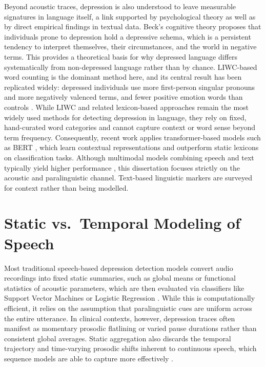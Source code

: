 \documentclass{mproj}
\begin{document}
Beyond acoustic traces, depression is also understood to leave measurable signatures in language itself, a link supported by psychological theory as well as by direct empirical findings in textual data. Beck's \cite{beck1967} cognitive theory proposes that individuals prone to depression hold a depressive schema, which is a persistent tendency to interpret themselves, their circumstances, and the world in negative terms. This provides a theoretical basis for why depressed language differs systematically from non-depressed language rather than by chance. LIWC-based word counting \cite{tausczik2010} is the dominant method here, and its central result has been replicated widely: depressed individuals use more first-person singular pronouns and more negatively valenced terms, and fewer positive emotion words than controls \cite{rude2004}. While LIWC and related lexicon-based approaches remain the most widely used methods for detecting depression in language, they rely on fixed, hand-curated word categories and cannot capture context or word sense beyond term frequency. Consequently, recent work applies transformer-based models such as BERT \cite{senn2022}, which learn contextual representations and outperform static lexicons on classification tasks. Although multimodal models combining speech and text typically yield higher performance \cite{alhanai2018}, this dissertation focuses strictly on the acoustic and paralinguistic channel. Text-based linguistic markers are surveyed for context rather than being modelled.

\section{Static vs.\ Temporal Modeling of Speech}\label{sec:static-temporal}

Most traditional speech-based depression detection models convert audio recordings into fixed static summaries, such as global means or functional statistics of acoustic parameters, which are then evaluated via classifiers like Support Vector Machines or Logistic Regression \cite{cummins2014ivectors,moore2008}. While this is computationally efficient, it relies on the assumption that paralinguistic cues are uniform across the entire utterance. In clinical contexts, however, depression traces often manifest as momentary prosodic flatlining or varied pause durations rather than consistent global averages. Static aggregation also discards the temporal trajectory and time-varying prosodic shifts inherent to continuous speech, which sequence models are able to capture more effectively \cite{graves2013}.
\end{document}
